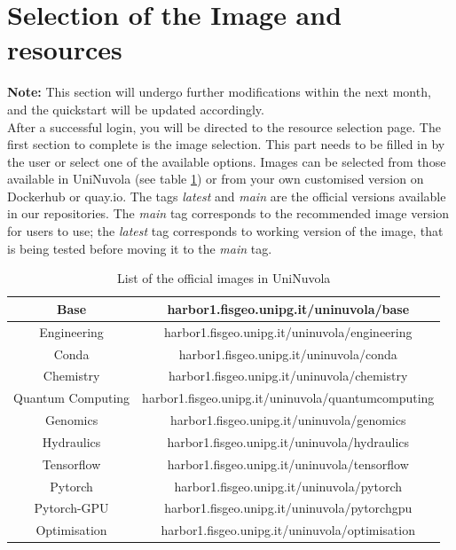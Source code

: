 \section{Selection of the Image and resources}

\textbf{Note:} This section will undergo further modifications within the next month, and the quickstart will be updated
accordingly. \\

After a successful login, you will be directed to the resource selection page. The first section to complete is the
image selection. This part needs to be filled in by the user or select one of the available options. Images can be
selected from those available in UniNuvola (see table \ref{tab:images}) or from your own customised version on
Dockerhub or quay.io. The tags \textit{latest} and \textit{main} are the official versions available in our repositories. The \textit{main} tag corresponds to the recommended image version for users to use; the \textit{latest} tag  corresponds to working version of the image, that is being tested before moving it to the \textit{main} tag.\\

\begin{table}[]
    \caption{List of the official images in UniNuvola}
    \label{tab:images}
    \centering
    \begin{tabular}{|c|c|}
        \hline
        Base              & harbor1.fisgeo.unipg.it/uninuvola/base             \\ \hline
        Engineering       & harbor1.fisgeo.unipg.it/uninuvola/engineering      \\ \hline
        Conda             & harbor1.fisgeo.unipg.it/uninuvola/conda            \\ \hline
        Chemistry         & harbor1.fisgeo.unipg.it/uninuvola/chemistry        \\ \hline
        Quantum Computing & harbor1.fisgeo.unipg.it/uninuvola/quantumcomputing \\ \hline
        Genomics          & harbor1.fisgeo.unipg.it/uninuvola/genomics         \\ \hline
        Hydraulics        & harbor1.fisgeo.unipg.it/uninuvola/hydraulics       \\ \hline
        Tensorflow        & harbor1.fisgeo.unipg.it/uninuvola/tensorflow       \\ \hline
        Pytorch           & harbor1.fisgeo.unipg.it/uninuvola/pytorch          \\ \hline
        Pytorch-GPU       & harbor1.fisgeo.unipg.it/uninuvola/pytorchgpu       \\ \hline
        Optimisation      & harbor1.fisgeo.unipg.it/uninuvola/optimisation     \\ \hline
    \end{tabular}
\end{table}


